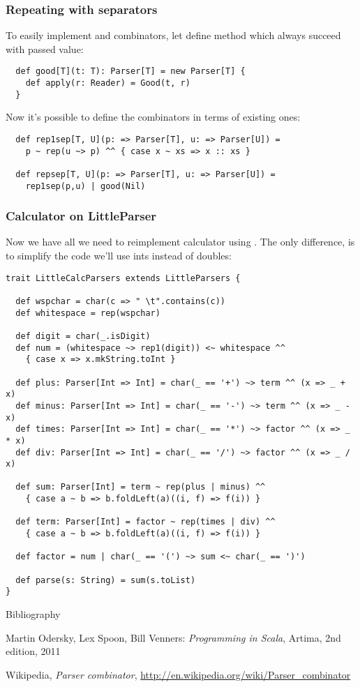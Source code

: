 \documentclass[t]{beamer}
\begin{document}
\begin{frame}[fragile]
\frametitle{Repeating with separators}
To easily implement  and  combinators, let define
method  which always succeed with passed value:

\begin{lstlisting}
  def good[T](t: T): Parser[T] = new Parser[T] {
    def apply(r: Reader) = Good(t, r)
  }
\end{lstlisting}

Now it's possible to define the combinators in terms of existing ones:

\begin{lstlisting}
  def rep1sep[T, U](p: => Parser[T], u: => Parser[U]) =
    p ~ rep(u ~> p) ^^ { case x ~ xs => x :: xs }

  def repsep[T, U](p: => Parser[T], u: => Parser[U]) =
    rep1sep(p,u) | good(Nil)
\end{lstlisting}
\end{frame}

\begin{frame}[fragile]
\frametitle{Calculator on LittleParser}
Now we have all we need to reimplement calculator using .
The only difference, is to simplify the code we'll use ints instead of doubles:
\begin{lstlisting}
trait LittleCalcParsers extends LittleParsers {

  def wspchar = char(c => " \t".contains(c))
  def whitespace = rep(wspchar)

  def digit = char(_.isDigit)
  def num = (whitespace ~> rep1(digit)) <~ whitespace ^^
    { case x => x.mkString.toInt }

  def plus: Parser[Int => Int] = char(_ == '+') ~> term ^^ (x => _ + x)
  def minus: Parser[Int => Int] = char(_ == '-') ~> term ^^ (x => _ - x)
  def times: Parser[Int => Int] = char(_ == '*') ~> factor ^^ (x => _ * x)
  def div: Parser[Int => Int] = char(_ == '/') ~> factor ^^ (x => _ / x)

  def sum: Parser[Int] = term ~ rep(plus | minus) ^^
    { case a ~ b => b.foldLeft(a)((i, f) => f(i)) }

  def term: Parser[Int] = factor ~ rep(times | div) ^^
    { case a ~ b => b.foldLeft(a)((i, f) => f(i)) }

  def factor = num | char(_ == '(') ~> sum <~ char(_ == ')')

  def parse(s: String) = sum(s.toList)
}
\end{lstlisting}
\end{frame}

\begin{frame}{Bibliography}
\begin{thebibliography}{00}
Martin Odersky, Lex Spoon, Bill Venners:
\emph{Programming in Scala},
Artima, 2nd edition, 2011

Wikipedia, \emph{Parser combinator}, \url{http://en.wikipedia.org/wiki/Parser_combinator}
\end{thebibliography}
\end{frame}

\end{document}
